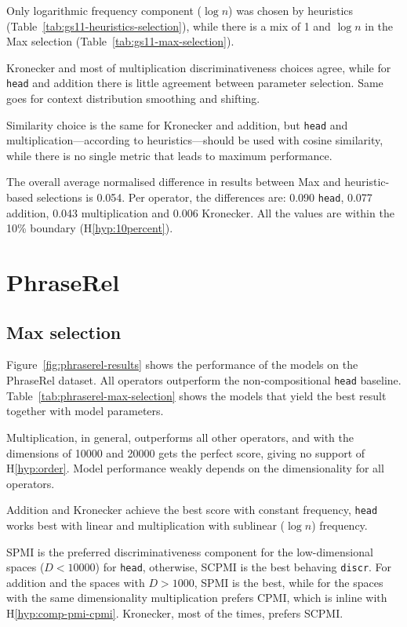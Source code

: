 Only logarithmic frequency component ($\log n$) was chosen by heuristics (Table~\ref{tab:gs11-heuristics-selection}), while there is a mix of 1 and $\log n$ in the Max selection (Table~\ref{tab:gs11-max-selection}).

Kronecker and most of multiplication discriminativeness choices agree, while for \texttt{head} and addition there is little agreement between parameter selection. Same goes for context distribution smoothing and shifting.

Similarity choice is the same for Kronecker and addition, but \texttt{head} and multiplication---according to heuristics---should be used with cosine similarity, while there is no single metric that leads to maximum performance.

The overall average normalised difference in results between Max and heuristic-based selections is 0.054. Per operator, the differences are: 0.090 \texttt{head}, 0.077 addition, 0.043 multiplication and 0.006 Kronecker. All the values are within the 10\% boundary (H\ref{hyp:10percent}).

\section{PhraseRel}
\label{sec:phraserel-experiment}

\subsection{Max selection}
\label{sec:max-selection-phraserel}



Figure~\ref{fig:phraserel-results} shows the performance of the models on the PhraseRel dataset. All operators outperform the non-compositional \texttt{head} baseline. Table~\ref{tab:phraserel-max-selection} shows the models that yield the best result together with model parameters.

Multiplication, in general, outperforms all other operators, and with the dimensions of 10000 and 20000 gets the perfect score, giving no support of H\ref{hyp:order}. Model performance weakly depends on the dimensionality for all operators.

Addition and Kronecker achieve the best score with constant frequency, \texttt{head} works best with linear and multiplication with sublinear ($\log n$) frequency.

SPMI is the preferred discriminativeness component for the low-dimensional spaces ($D < 10000$) for \texttt{head}, otherwise, SCPMI is the best behaving \texttt{discr}. For addition and the spaces with $D > 1000$, SPMI is the best, while for the spaces with the same dimensionality multiplication prefers CPMI, which is inline with H\ref{hyp:comp-pmi-cpmi}. Kronecker, most of the times, prefers SCPMI.

